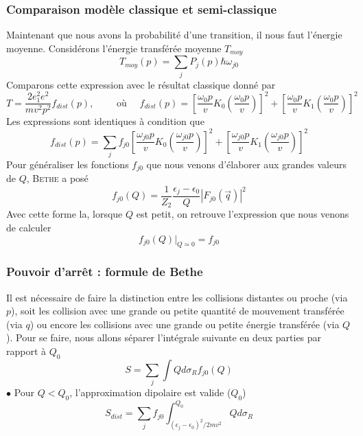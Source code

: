 \subsubsection{Comparaison modèle classique et semi-classique}
Maintenant que nous avons la probabilité d'une transition, il nous faut l'énergie moyenne. 
Considérons l'énergie transférée moyenne $T_{moy}$
\begin{equation}
T_{moy}(p)=\sum_jP_j(p)\hbar\omega_{j0}
\end{equation}
Comparons cette expression avec le résultat classique donné par 
\begin{equation}
T= \frac{2e_1^2e^2}{mv^2p^2}f_{dist}(p),\qquad\text{ où }\quad 
f_{dist}(p)=\left[\frac{\omega_{0}p}{v}K_0\left(\frac{\omega_{0}p}{v}\right)\right]^2+\left[\frac{\omega_{0}p}{v}K_1\left(\frac{\omega_{0}p}{v}\right)\right]^2
\end{equation}
Les expressions sont identiques à condition que
\begin{equation}
f_{dist}(p)=\sum_jf_{j0}\left[\frac{\omega_{j0}p}{v}K_0\left(\frac{\omega_{j0}p}{v}\right)\right]^2+\left[\frac{\omega_{j0}p}{v}K_1\left(\frac{\omega_{j0}p}{v}\right)\right]^2
\end{equation}
Pour généraliser les fonctions $f_{j0}$ que nous venons d'élaborer aux grandes valeurs de $Q$, 
\textsc{Bethe} a posé
\begin{equation}
f_{j0}(Q)=\frac{1}{Z_2}\frac{\epsilon_j-\epsilon_0}{Q}|F_{j0}(\overrightarrow{q})|^2
\end{equation}
Avec cette forme la, lorsque $Q$ est petit, on retrouve l'expression que nous venons de calculer
\begin{equation}
f_{j0}(Q)\big\vert_{Q\simeq 0}=f_{j0}
\end{equation}

\subsubsection{Pouvoir d'arrêt : formule de Bethe}
Il est nécessaire de faire la distinction entre les collisions distantes ou proche (via $p$), soit 
les collision avec une grande ou petite quantité de mouvement transférée (via $q$) ou encore 
les collisions avec une grande ou petite énergie transférée (via $Q$). Pour se faire, 
nous allons séparer l'intégrale suivante en deux parties par rapport à $Q_0$
\begin{equation}
S=\sum_j\int Q d\sigma_Rf_{j0}(Q)
\end{equation}
$\bullet$ Pour $Q<Q_0$, l'approximation dipolaire est valide ($Q_0$)
\begin{equation}
S_{dist}=\sum_jf_{j0}\int_{(\epsilon_j-\epsilon_0)^2/2mv^2}^{Q_0} Q d\sigma_R
\end{equation}

